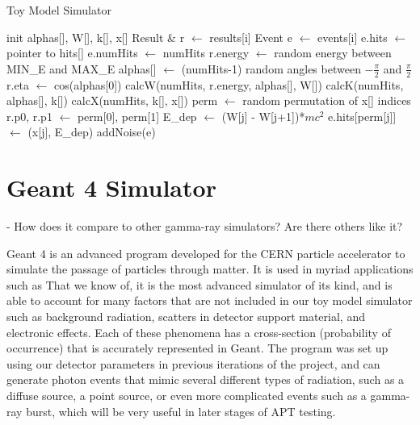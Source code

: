 \begin{algorithm}
\caption{Toy Model Simulator}\label{recon}
\begin{algorithmic}[1]
    \State init alphas[], W[], k[], x[] 
    \State {}
        \State Result \& r $\leftarrow$ results[i] 
        \State Event e $\leftarrow$ events[i]
        \State e.hits $\leftarrow$ pointer to hits[]
        \State e.numHits $\leftarrow$ numHits
        \State
        \State r.energy $\leftarrow$ random energy between MIN\_E and MAX\_E 
        \State
        \State alphas[] $\leftarrow$ (numHits-1) random angles between $-\frac{\pi}{2}$ and $\frac{\pi}{2}$ 
        \State r.eta $\leftarrow$ cos(alphas[0]) 
        \State 
        \State calcW(numHits, r.energy, alphas[], W[]) 
        \State calcK(numHits, alphas[], k[]) 
        \State calcX(numHits, k[], x[]) 
        \State
        \State perm $\leftarrow$ random permutation of x[] indices
        \State r.p0, r.p1 $\leftarrow$ perm[0], perm[1] 
        \State 
            \State E\_dep $\leftarrow$ (W[j] - W[j+1])*$mc^2$ 
            \State e.hits[perm[j]] $\leftarrow$ (x[j], E\_dep)
        \EndFor
        \State
        \State addNoise(e) 
    \EndFor
\EndFunction
\end{algorithmic}
\end{algorithm}

\section{Geant 4 Simulator}
- How does it compare to other gamma-ray simulators? Are there others like it?

Geant 4 is an advanced program developed for the CERN particle accelerator to simulate the passage of particles through matter. It is used in myriad applications such as That we know of, it is the most advanced simulator of its kind, and is able to account for many factors that are not included in our toy model simulator such as background radiation, scatters in detector support material, and electronic effects. Each of these phenomena has a cross-section (probability of occurrence) that is accurately represented in Geant. The program was set up using our detector parameters in previous iterations of the project, and can generate photon events that mimic several different types of radiation, such as a diffuse source, a point source, or even more complicated events such as a gamma-ray burst, which will be very useful in later stages of APT testing.

